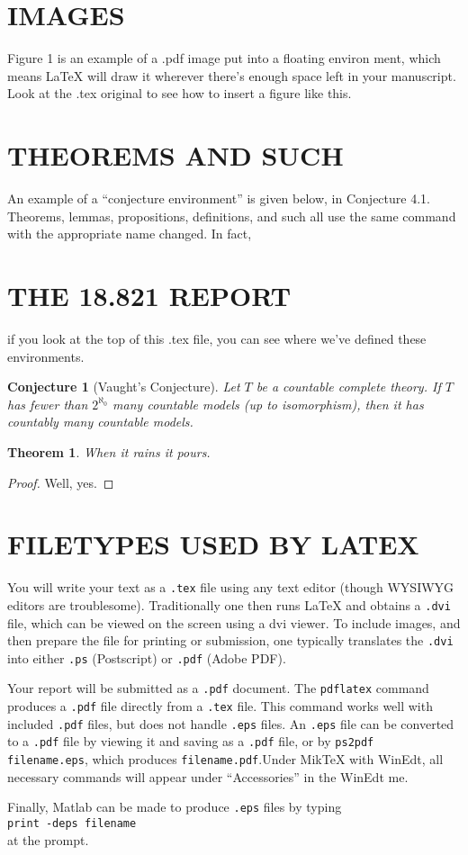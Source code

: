 \documentclass{article}
\newtheorem{theorem}{Theorem}
\newtheorem{conjecture}{Conjecture}
\begin{document}
\section{IMAGES}
Figure 1 is an example of a .pdf image put into a ﬂoating environ­
ment, which means LaTeX will draw it wherever there’s enough space
left in your manuscript. Look at the .tex original to see how to insert
a ﬁgure like this.
\section{THEOREMS AND SUCH}
An example of a “conjecture environment” is given below, in Con­jecture 4.1. Theorems, lemmas, propositions, deﬁnitions, and such all
use the same command with the appropriate name changed. In fact,
\newpage \section*{THE 18.821 REPORT}if you look at the top of this .tex ﬁle, you can see where we’ve deﬁned these environments.\\
\begin{conjecture}[Vaught's Conjecture]Let $T$ be a countable complete theory. If $T$ has fewer than $2^{\aleph_0}$ many countable models (up to isomorphism), then it has countably many countable models.
\end{conjecture}
\begin{theorem}
	When it rains it pours.
\end{theorem}
\begin{proof}
	Well, yes.
\end{proof}
\section{FILETYPES USED BY LATEX}
You will write your text as  a \texttt{.tex} file using any text editor (though WYSIWYG editors are troublesome). Traditionally one then runs \LaTeX{} and obtains a \texttt{.dvi} file, which can be viewed on the screen using a dvi viewer. To include images, and then prepare the file for printing or submission, one typically translates the \texttt{.dvi} into either \texttt{.ps} (Postscript) or \texttt{.pdf} (Adobe PDF).
\par{}\hspace{0.5 cm}Your report will be submitted as a \texttt{.pdf} document. The \texttt{pdflatex} command produces a \texttt{.pdf} file directly from a \texttt{.tex} file. This command works well with included \texttt{.pdf} files, but does not handle \texttt{.eps} files. An \texttt{.eps} file can be converted to a \texttt{.pdf} file by viewing it and saving as a \texttt{.pdf} file, or by \texttt{ps2pdf filename.eps}, which produces \texttt{filename.pdf}.Under MikTeX with WinEdt, all necessary commands will appear under “Accessories” in the WinEdt me.
\par{}\hspace{0.5 cm} Finally, Matlab can be made to produce \texttt{.eps} files by typing\\
\hspace{3 cm} \texttt{print -deps filename}\\ at the prompt.
\end{document}
